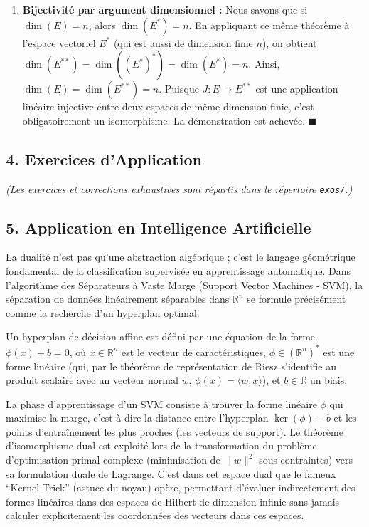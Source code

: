 \begin{enumerate}
  donc fausse. On en déduit que \(x = 0_E\), d'où \(\ker(J) = \{0_E\}\).
  \(J\) est injective.
\item
  \textbf{Bijectivité par argument dimensionnel :} Nous savons que si
  \(\dim(E) = n\), alors \(\dim(E^*) = n\). En appliquant ce même
  théorème à l'espace vectoriel \(E^*\) (qui est aussi de dimension
  finie \(n\)), on obtient
  \(\dim(E^{**}) = \dim((E^*)^*) = \dim(E^*) = n\). Ainsi,
  \(\dim(E) = \dim(E^{**}) = n\). Puisque \(J : E \to E^{**}\) est une
  application linéaire injective entre deux espaces de même dimension
  finie, c'est obligatoirement un isomorphisme. La démonstration est
  achevée. \(\blacksquare\)
\end{enumerate}

\hypertarget{exercices-dapplication}{%
\subsection{4. Exercices d'Application}\label{exercices-dapplication}}

\emph{(Les exercices et corrections exhaustives sont répartis dans le
répertoire \texttt{exos/}.)}

\hypertarget{application-en-intelligence-artificielle}{%
\subsection{5. Application en Intelligence
Artificielle}\label{application-en-intelligence-artificielle}}

La dualité n'est pas qu'une abstraction algébrique ; c'est le langage
géométrique fondamental de la classification supervisée en apprentissage
automatique. Dans l'algorithme des Séparateurs à Vaste Marge (Support
Vector Machines - SVM), la séparation de données linéairement séparables
dans \(\mathbb{R}^n\) se formule précisément comme la recherche d'un
hyperplan optimal.

Un hyperplan de décision affine est défini par une équation de la forme
\(\phi(x) + b = 0\), où \(x \in \mathbb{R}^n\) est le vecteur de
caractéristiques, \(\phi \in (\mathbb{R}^n)^*\) est une forme linéaire
(qui, par le théorème de représentation de Riesz s'identifie au produit
scalaire avec un vecteur normal \(w\),
\(\phi(x) = \langle w, x \rangle\)), et \(b \in \mathbb{R}\) un biais.

La phase d'apprentissage d'un SVM consiste à trouver la forme linéaire
\(\phi\) qui maximise la marge, c'est-à-dire la distance entre
l'hyperplan \(\ker(\phi) - b\) et les points d'entraînement les plus
proches (les vecteurs de support). Le théorème d'isomorphisme dual est
exploité lors de la transformation du problème d'optimisation primal
complexe (minimisation de \(\|w\|^2\) sous contraintes) vers sa
formulation duale de Lagrange. C'est dans cet espace dual que le fameux
``Kernel Trick'' (astuce du noyau) opère, permettant d'évaluer
indirectement des formes linéaires dans des espaces de Hilbert de
dimension infinie sans jamais calculer explicitement les coordonnées des
vecteurs dans ces espaces.

